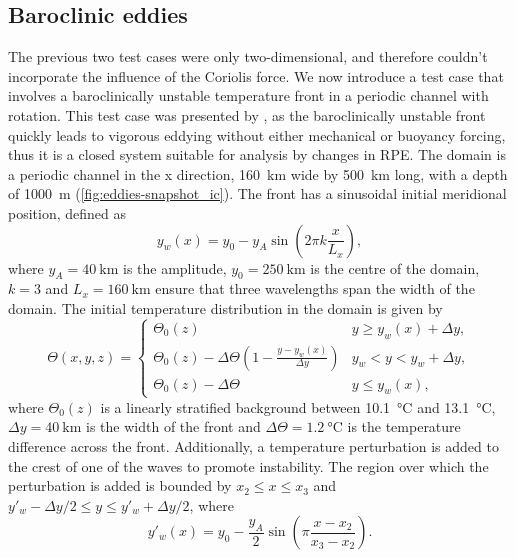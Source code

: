 \subsection{Baroclinic eddies}


The previous two test cases were only two-dimensional, and therefore couldn't incorporate the influence of the Coriolis force. We now introduce a test case that involves a baroclinically unstable temperature front in a periodic channel with rotation. This test case was presented by \citet{ilicak12}, as the baroclinically unstable front quickly leads to vigorous eddying without either mechanical or buoyancy forcing, thus it is a closed system suitable for analysis by changes in RPE. The domain is a periodic channel in the x direction, \SI{160}{\kilo\metre} wide by \SI{500}{\kilo\metre} long, with a depth of \SI{1000}{\metre} (\cref{fig:eddies-snapshot_ic}). The front has a sinusoidal initial meridional position, defined as
%
\begin{equation}
  y_w(x) = y_0 - y_A \sin\left(2\pi k \frac{x}{L_x}\right),
\end{equation}
%
where $y_A = \SI{40}{\kilo\metre}$ is the amplitude, $y_0 = \SI{250}{\kilo\metre}$ is the centre of the domain, $k = 3$ and $L_x = \SI{160}{\kilo\metre}$ ensure that three wavelengths span the width of the domain. The initial temperature distribution in the domain is given by
%
\begin{equation}
  \Theta(x,y,z) = \begin{cases}
    \Theta_0(z) & y \ge y_w(x) + \Delta y, \\
    \Theta_0(z) - \Delta \Theta \left(1 - \frac{y - y_w(x)}{\Delta y}\right) & y_w < y < y_w + \Delta y, \\
    \Theta_0(z) - \Delta \Theta & y \le y_w(x),
  \end{cases}
\end{equation}
%
where $\Theta_0(z)$ is a linearly stratified background between \SI{10.1}{\celsius} and \SI{13.1}{\celsius}, $\Delta y = \SI{40}{\kilo\metre}$ is the width of the front and $\Delta \Theta = \SI{1.2}{\celsius}$ is the temperature difference across the front. Additionally, a temperature perturbation is added to the crest of one of the waves to promote instability. The region over which the perturbation is added is bounded by $x_2 \le x \le x_3$ and $y'_w - \Delta y / 2 \le y \le y'_w + \Delta y / 2$, where
%
\begin{equation}
  y'_w(x) = y_0 - \frac{y_A}{2}\sin\left(\pi \frac{x - x_2}{x_3 - x_2}\right).
\end{equation}

